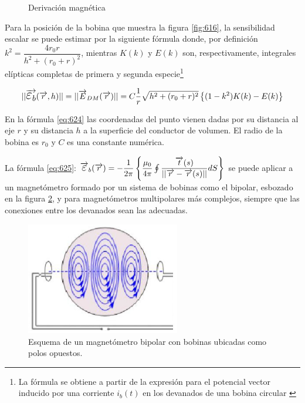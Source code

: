 \begin{figure}[H]
\begin{minipage}[b]{0.5\textwidth}
     \caption{Derivación magnética}
	\label{fig:617}
  \end{minipage}
\end{figure}


Para la posición de la bobina que muestra la figura \ref{fig:616}, la sensibilidad escalar se puede estimar por la siguiente fórmula donde, por definición $k^{2}=\dfrac{4r_{0}r}{h^{2}+(r_{0}+r)^{2}}$, mientras $K(k)$ y $E(k)$ son, respectivamente, integrales elípticas completas de primera y segunda especie\footnote{La fórmula se obtiene a partir de la expresión para el potencial vector inducido por una corriente $i_{b}(t)$ en los devanados de una bobina circular \citep{Nikolski_1976} \citep{Malmivuo_1995}}

\begin{equation}
	\label{eq:624}
	\vert\vert \V{\Bb{\varepsilon}_{b}}(\V{r}, h) \vert\vert = 
	\vert\vert \V{E}_{DM}(\V{r}) \vert\vert = 
	C\dfrac{1}{r}\sqrt{h^{2}+(r_{0}+r)^{2}}\left\lbrace (1-k^{2})K(k)-E(k) \right\rbrace 
\end{equation}

En la fórmula \ref{eq:624} las coordenadas del punto vienen dadas por su distancia al eje $r$ y su distancia $h$ a la superficie del conductor de volumen. El radio de la bobina es $r_{0}$ y $C$ es una constante numérica.

La fórmula \ref{eq:625}: $\V{\Bb{\varepsilon}}_{b}(\V{r})= -\dfrac{1}{2\pi} \left\lbrace \dfrac{\mu_{0}}{4\pi} \oint \dfrac{\V{t}(s)}{\vert\vert \V{r}-\V{r}(s) \vert\vert } dS  \right\rbrace$ se puede aplicar a un magnetómetro formado por un sistema de bobinas como el bipolar, esbozado en la figura \ref{fig:618}, y para magnetómetros multipolares más complejos, siempre que las conexiones entre los devanados sean las adecuadas.


\begin{figure}[H]
    \centering
    \includegraphics[width=0.6\textwidth]{./Figures/fig618}
	\caption{Esquema de un magnetómetro bipolar con bobinas ubicadas como polos opuestos.}
	\label{fig:618}
\end{figure}

